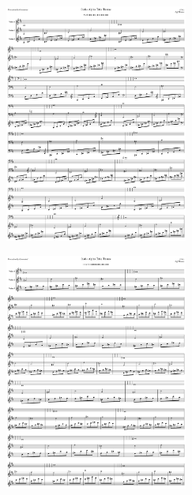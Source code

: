 \begin{figure}[H]                                             
{                                                             
  \setlength{\tabcolsep}{3.0pt}                               
  \setlength\cmidrulewidth{\heavyrulewidth} %
    \begin{subfigure}{0.5\textwidth}                            
  \includegraphics[width=6cm]{music/title_no_9_page_1001.png}%
    \end{subfigure}                                             
  \begin{subfigure}{0.5\textwidth}                            
  \includegraphics[width=6cm]{music/title_no_10_page_1001.png}%
    \end{subfigure}                                             
}                                                             
\end{figure}                                                  


